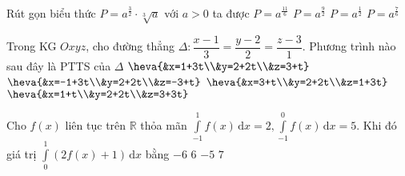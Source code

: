 \begin{ex}%
Rút gọn biểu thức $P=a^\frac{3}{2}\cdot\sqrt[3]{a}$ với $a>0$ ta được
\choice
{\True $P=a^{\frac{11}{6}}$}
{$P=a^{\frac{9}{2}}$}
{$P=a^{\frac{1}{2}}$}
{$P=a^{\frac{7}{6}}$}
\end{ex}

\begin{ex}%
Trong KG $Oxyz$, cho đường thẳng $\Delta\colon \dfrac{x-1}{3}=\dfrac{y-2}{2}=\dfrac{z-3}{1}$. Phương trình nào sau đây là PTTS của $\Delta$
\choice
{\True $\heva{&x=1+3t\\&y=2+2t\\&z=3+t}$}
{$\heva{&x=-1+3t\\&y=2+2t\\&z=-3+t}$}
{$\heva{&x=3+t\\&y=2+2t\\&z=1+3t}$}
{$\heva{&x=1+t\\&y=2+2t\\&z=3+3t}$}
\end{ex}

\begin{ex}%
Cho $f(x)$ liên tục trên $\mathbb{R}$ thỏa mãn $\displaystyle\int\limits_{-1}^1f(x) \mathrm{\,d}x=2, \displaystyle\int\limits_{-1}^0f(x) \mathrm{\,d}x=5$. Khi đó giá trị $\displaystyle\int\limits_0^1(2 f(x)+1) \mathrm{\,d}x$ bằng
\choice
{$-6$}
{$6$}
{\True $-5$}
{$7$}
\end{ex}

